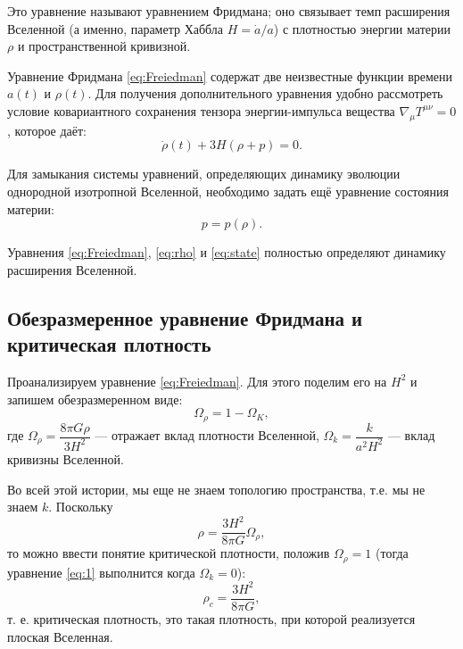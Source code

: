 \documentclass[]{article}
\begin{document}
Это уравнение называют уравнением Фридмана; оно связывает темп расширения Вселенной (а именно, параметр Хаббла $H = \dot{a}/a$) с плотностью энергии материи $\rho$ и пространственной кривизной.

Уравнение Фридмана \eqref{eq:Freiedman} содержат две неизвестные функции времени $a(t)$ и $\rho(t)$.
Для получения дополнительного уравнения удобно рассмотреть условие ковариантного сохранения тензора энергии-импульса вещества $\nabla_{\mu} T^{\mu\nu} = 0$, которое даёт:
\begin{equation}\label{eq:rho}
	\dot{\rho}(t) + 3H(\rho + p) = 0.
\end{equation}

Для замыкания системы уравнений, определяющих динамику эволюции однородной изотропной Вселенной, необходимо задать ещё уравнение состояния материи:
\begin{equation}\label{eq:state}
	p = p(\rho).
\end{equation}

Уравнения \eqref{eq:Freiedman}, \eqref{eq:rho} и \eqref{eq:state} полностью определяют динамику расширения Вселенной.

\subsection{Обезразмеренное уравнение Фридмана и критическая плотность}

Проанализируем уравнение \eqref{eq:Freiedman}. Для этого поделим его на $H^2$  и запишем обезразмеренном виде:
\begin{equation}\label{eq:1}
	\Omega_{\rho} = 1- \Omega_{K},
\end{equation}
где $\Omega_{\rho} = \dfrac{8\pi G \rho}{3H^2}$ --- отражает вклад плотности Вселенной, $\Omega_{k} = \dfrac{k}{a^2H^2}$ --- вклад кривизны Вселенной.

Во всей этой истории, мы еще не знаем топологию пространства, т.е. мы не знаем $k$. Поскольку
\begin{equation*}\label{}
	\rho = \frac{3H^2}{8\pi G} \Omega_{\rho},
\end{equation*}
то можно ввести понятие критической плотности, положив $\Omega_{\rho} = 1$ (тогда уравнение \eqref{eq:1} выполнится когда $\Omega_k = 0$):
\begin{equation}\label{eq:cr}
	\rho_c = \frac{3H^2}{8\pi G},
\end{equation}
т. е. критическая плотность, это такая плотность, при которой реализуется плоская Вселенная.
\end{document}
